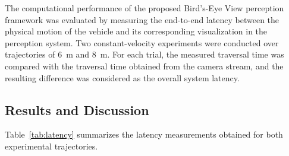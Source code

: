 The computational performance of the proposed Bird's-Eye View perception framework was evaluated by measuring the end-to-end latency between the physical motion of the vehicle and its corresponding visualization in the perception system. Two constant-velocity experiments were conducted over trajectories of 6~m and 8~m. For each trial, the measured traversal time was compared with the traversal time obtained from the camera stream, and the resulting difference was considered as the overall system latency.

\subsection{Results and Discussion}

Table~\ref{tab:latency} summarizes the latency measurements obtained for both experimental trajectories.


